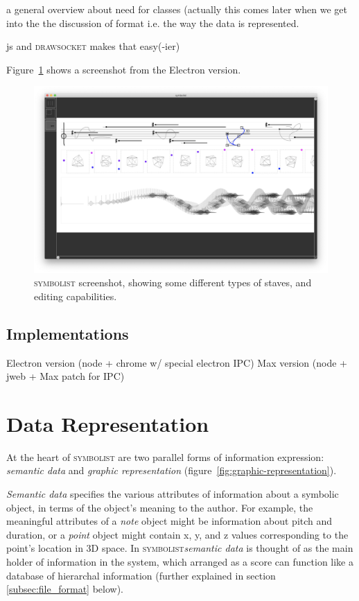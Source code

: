 \documentclass{article}
\def\symbolist{\textsc{symbolist}\xspace}
\def\drawsocket{\textsc{drawsocket}\xspace}
\begin{document}
\cite{hajdu2005quintet}

a general overview about need for classes (actually this comes later when we get into the the discussion of format i.e. the way the data is represented.

js and \drawsocket makes that easy(-ier)


Figure~\ref{fig:screenshot} shows a screenshot from the Electron version.


\begin{figure}[ht!]
\centering
\includegraphics[width=2\columnwidth]{symbolist.png}
\caption{ \symbolist screenshot, showing some different types of staves, and editing capabilities.
\label{fig:screenshot}}
\end{figure}


\subsection{Implementations}\label{sec:implementations}

Electron version (node + chrome w/ special electron IPC)
Max version (node + jweb + Max patch for IPC)

\section{Data Representation}\label{subsec:representation}

At the heart of \symbolist are two parallel forms of information expression: \textit{semantic data} and \textit{graphic representation} (figure~\ref{fig:graphic-representation}).

\textit{Semantic data} specifies the various attributes of information about a symbolic object, in terms of the object's meaning to the author. 
For example, the meaningful attributes of a \textit{note} object might be information about pitch and duration, or a \textit{point} object might contain x, y, and z values corresponding to the point's location in 3D space. In \symbolist \textit{semantic data} is thought of as the main holder of information in the system, which arranged as a score can function like a database of hierarchal information (further explained in section \ref{subsec:file_format} below).
\end{document}

